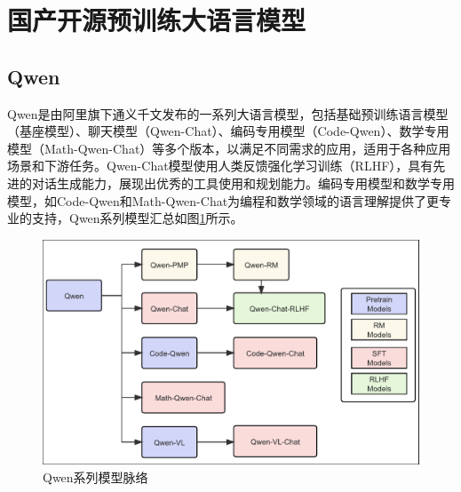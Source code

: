 \documentclass[
    decl-page,  %
    ,fontset = win, %
  ]{njuthesis}
\begin{document}


\section{国产开源预训练大语言模型}
\subsection{Qwen}
Qwen是由阿里旗下通义千文发布的一系列大语言模型，包括基础预训练语言模型（基座模型）、聊天模型（Qwen-Chat）、编码专用模型（Code-Qwen）、数学专用模型（Math-Qwen-Chat）等多个版本，以满足不同需求的应用，适用于各种应用场景和下游任务。Qwen-Chat模型使用人类反馈强化学习训练（RLHF）\cite{christiano2017deep}，具有先进的对话生成能力，展现出优秀的工具使用和规划能力。编码专用模型和数学专用模型，如Code-Qwen和Math-Qwen-Chat为编程和数学领域的语言理解提供了更专业的支持，Qwen系列模型汇总如图\ref{Qwen}所示。

\begin{figure}[ht]
  \centering
  \includegraphics[width=\textwidth]{image/Qwen.pdf}
  \caption{Qwen系列模型脉络}
  \label{Qwen}
\end{figure}
\end{document}
